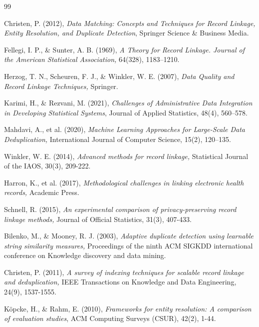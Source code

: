 \documentclass[twoside]{article}
\begin{document}
\begin{thebibliography}{99}
	
	Christen, P. (2012), {\it Data Matching: Concepts and Techniques for Record Linkage, Entity Resolution, and Duplicate Detection}, Springer Science \& Business Media.
	
	Fellegi, I. P., \& Sunter, A. B. (1969), {\it A Theory for Record Linkage. Journal of the American Statistical Association,} 64(328), 1183–1210.
	
	Herzog, T. N., Scheuren, F. J., \& Winkler, W. E. (2007), {\it Data Quality and Record Linkage Techniques,} Springer.
	
	Karimi, H., \& Rezvani, M. (2021), {\it Challenges of Administrative Data Integration in Developing Statistical Systems}, Journal of Applied Statistics, 48(4), 560–578.
	
	Mahdavi, A., et al. (2020), {\it Machine Learning Approaches for Large-Scale Data Deduplication,} International Journal of Computer Science, 15(2), 120–135.
	
	Winkler, W. E. (2014), {\it Advanced methods for record linkage,} Statistical Journal of the IAOS, 30(3), 209-222.
	
	Harron, K., et al. (2017), {\it Methodological challenges in linking electronic health records,} Academic Press.
	
	Schnell, R. (2015), {\it An experimental comparison of privacy-preserving record linkage methods,} Journal of Official Statistics, 31(3), 407-433.
	
	Bilenko, M., \& Mooney, R. J. (2003), {\it Adaptive duplicate detection using learnable string similarity measures,} Proceedings of the ninth ACM SIGKDD international conference on Knowledge discovery and data mining.
	
	Christen, P. (2011), {\it A survey of indexing techniques for scalable record linkage and deduplication,} IEEE Transactions on Knowledge and Data Engineering, 24(9), 1537-1555.
	
	Köpcke, H., \& Rahm, E. (2010), {\it Frameworks for entity resolution: A comparison of evaluation studies}, ACM Computing Surveys (CSUR), 42(2), 1-44.
	

\end{thebibliography}
\end{document}
